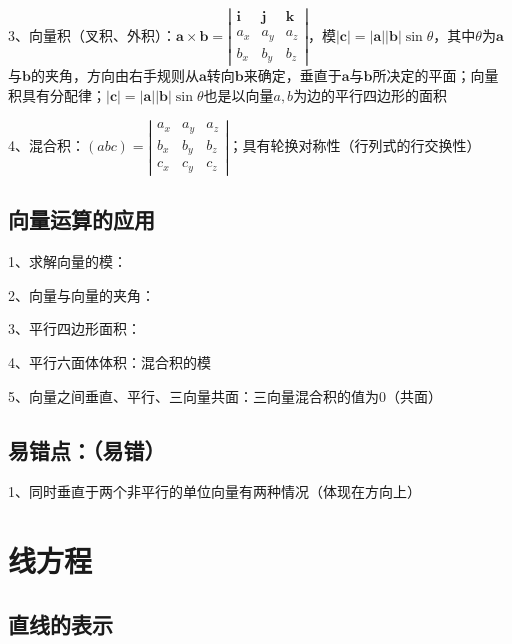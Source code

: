 3、向量积（叉积、外积）：$\boldsymbol{a} \times \boldsymbol{b}=\left|\begin{array}{ccc}\boldsymbol{i} & \boldsymbol{j} & \boldsymbol{k} \\a_{x} & a_{y} & a_{z} \\b_{x} & b_{y} & b_{z}\end{array}\right|$，模$|\boldsymbol{c}|=|\boldsymbol{a}||\boldsymbol{b}| \sin \theta$，其中$\theta$为$\boldsymbol{a}$与$\boldsymbol{b}$的夹角，方向由右手规则从$\boldsymbol{a}$转向$\boldsymbol{b}$来确定，垂直于$\boldsymbol{a}$与$\boldsymbol{b}$所决定的平面；向量积具有分配律；$|\boldsymbol{c}|=|\boldsymbol{a}||\boldsymbol{b}| \sin \theta$也是以向量$a,b$为边的平行四边形的面积

4、混合积：$(a b c)=\left|\begin{array}{lll}a_{x} & a_{y} & a_{z} \\b_{x} & b_{y} & b_{z} \\c_{x} & c_{y} & c_{z}\end{array}\right|$；具有轮换对称性（行列式的行交换性）



\subsection{向量运算的应用}

1、求解向量的模：

2、向量与向量的夹角：

3、平行四边形面积：

4、平行六面体体积：混合积的模

5、向量之间垂直、平行、三向量共面：三向量混合积的值为0（共面）



\subsection{易错点：（易错）}

1、同时垂直于两个非平行的单位向量有两种情况（体现在方向上）

\section{线方程}



\subsection{直线的表示}

